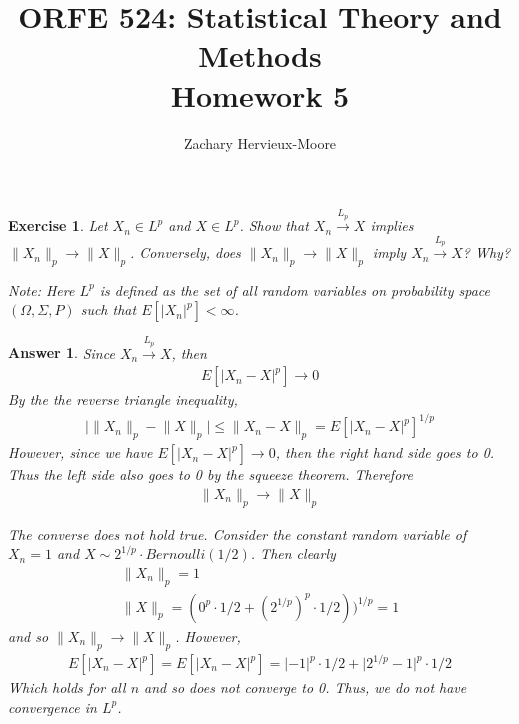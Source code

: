 \documentclass[12pt]{article}
\title{ORFE 524: Statistical Theory and Methods \\ Homework 5}
\author{Zachary Hervieux-Moore}
\date{\displaydate{date}}
\theoremstyle{colon}
\newtheorem{exercise}{Exercise}
\newtheorem*{answer}{Answer}
\begin{document}
\maketitle

\clearpage

\begin{exercise}
  Let $X_n \in L^p$ and $X \in L^p$. Show that $X_n \xrightarrow{L_p} X$ implies $\lVert X_n \rVert_p \rightarrow \lVert X \rVert_p$. Conversely, does $\lVert X_n \rVert_p \rightarrow \lVert X \rVert_p$ imply $X_n \xrightarrow{L_p} X$? Why?

  Note: Here $L^p$ is defined as the set of all random variables on probability space $(\Omega, \Sigma, P)$ such that $E[ \lvert X_n \rvert^p ] < \infty$.
\end{exercise}

\begin{answer}
  Since $X_n \xrightarrow{L_p} X$, then
  \begin{gather*}
    E[ \lvert X_n - X \rvert^p ] \rightarrow 0
  \end{gather*}
  By the the reverse triangle inequality,
  \begin{gather*}
    \Big\lvert \lVert X_n \rVert_p - \lVert X \rVert_p \Big\rvert \leq \lVert X_n - X \rVert_p =  E[ \lvert X_n - X \rvert^p ]^{1/p}
  \end{gather*}
  However, since we have $E[ \lvert X_n - X \rvert^p ] \rightarrow 0$, then the right hand side goes to 0. Thus the left side also goes to 0 by the squeeze theorem. Therefore
  \begin{gather*}
    \lVert X_n \rVert_p \rightarrow \lVert X \rVert_p
  \end{gather*}

  The converse does not hold true. Consider the constant random variable of $X_n = 1$ and $X \sim 2^{1/p} \cdot Bernoulli(1/2)$. Then clearly
  \begin{gather*}
    \lVert X_n \rVert_p = 1 \\
    \lVert X \rVert_p = (0^p \cdot 1/2 + (2^{1/p})^p \cdot 1/2))^{1/p} = 1
  \end{gather*}
  and so $\lVert X_n \rVert_p \rightarrow \lVert X \rVert_p$. However,
  \begin{gather*}
    E[ \lvert X_n - X \rvert^p ] = E[ \lvert X_n - X \rvert^p ] = \lvert -1 \rvert^p \cdot 1/2 + \lvert 2^{1/p} - 1 \rvert^p \cdot 1/2
  \end{gather*}
  Which holds for all $n$ and so does not converge to 0. Thus, we do not have convergence in $L^p$.
\end{answer}
\end{document}
